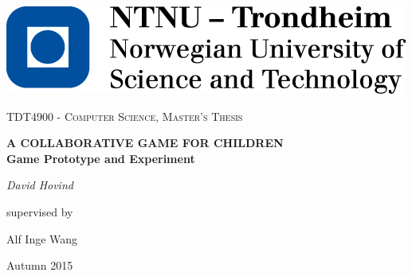 \begin{titlepage}
	\includegraphics[]{images/ntnu_logo}\par\vspace{1.5cm}
	\centering
	{\scshape\Large TDT4900 - Computer Science, Master's Thesis\par}
	\vspace{1.5cm}
	{\huge\bfseries \uppercase{A collaborative game for children} \\ 
	\Large Game Prototype and Experiment\par}
	\vspace{2cm}
	{\Large\itshape David Hovind\par}
	\vfill
	supervised by\par
	Alf Inge Wang
	
	\vfill
	
	{\large Autumn 2015}
\end{titlepage}
